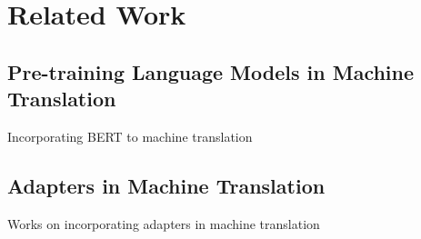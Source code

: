 \chapter{Related Work}

\section{Pre-training Language Models in Machine Translation}
Incorporating BERT to machine translation
\subsection{}
\subsection{}
\subsection{}



\section{Adapters in Machine Translation}
Works on incorporating adapters in machine translation
\subsection{}
\subsection{}
\subsection{}
